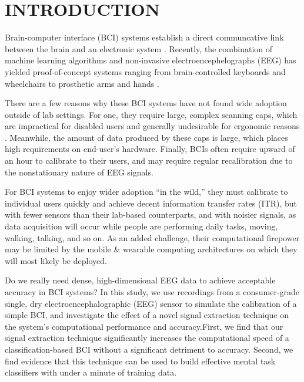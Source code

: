 \section{\uppercase{Introduction}}
\label{sec:introduction}

\noindent Brain-computer interface (BCI) systems establish a direct communcative link between the brain and an electronic system \cite{dornhege_toward_2007,mcfarland_brain-computer_2011}.  Recently, the combination of machine learning algorithms and non-invasive electroencephelographs (EEG) has yielded proof-of-concept systems ranging from brain-controlled keyboards and wheelchairs to prosthetic arms and hands \cite{blankertz_note_2007,millan_combining_2010,d._mattia_brain_2011,hill_practical_2014,campbell_neurophone:_2010}. 

There are a few reasons why these BCI systems have not found wide adoption outside of lab settings. For one, they require large, complex scanning caps, which are impractical for disabled users and generally undesirable for ergonomic reasons \cite{ekandem_evaluating_2012,leeb_transferring_2013}. Meanwhile, the amount of data produced by these caps is large, which places high requirements on end-user's hardware. Finally, BCIs often require upward of an hour to calibrate to their users, and may require regular recalibration due to the nonstationary nature of EEG signals. \cite{vidaurre_fully_2006,vidaurre_co-adaptive_2011,blankertz_non-invasive_2007} 

For BCI systems to enjoy wider adoption ``in the wild,'' they must calibrate to individual users quickly and achieve decent information transfer rates (ITR), but with fewer sensors than their lab-based counterparts, and with noisier signals, as data acquisition will occur while people are performing daily tasks, moving, walking, talking, and so on. As an added challenge, their computational firepower may be limited by the mobile \& wearable computing architectures on which they will most likely be deployed. 

Do we really need dense, high-dimensional EEG data to achieve acceptable accuracy in BCI systems? In this study, we use recordings from a consumer-grade single, dry electroencephalographic (EEG) sensor to simulate the calibration of a simple BCI, and investigate the effect of a novel signal extraction technique on the system’s computational performance and accuracy.First, we find that our signal extraction technique significantly increases the computational speed of a classification-based BCI without a significant detriment to accuracy. Second, we find evidence that this technique can be used to build effective mental task classifiers with under a minute of training data.